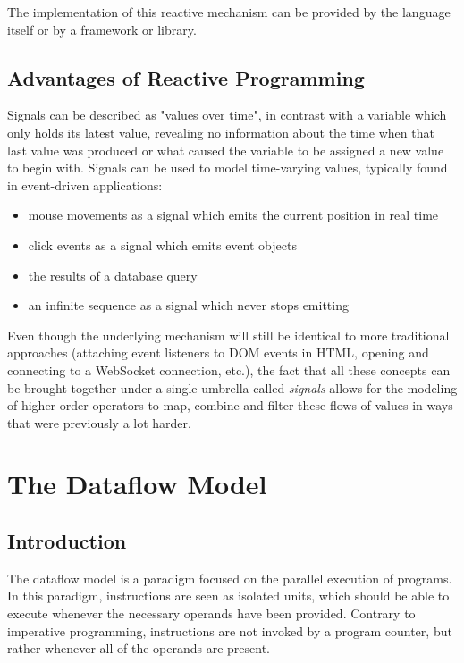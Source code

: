 The implementation of this reactive mechanism can be provided by the language itself or by a framework or library. 

\subsection{Advantages of Reactive Programming}

Signals can be described as "values over time", in contrast with a variable which only holds its latest value, revealing no information about the time when that last value was produced or what caused the variable to be assigned a new value to begin with. 
Signals can be used to model time-varying values, typically found in event-driven applications:
\begin{itemize}
	\item mouse movements as a signal which emits the current position in real time
	\item click events as a signal which emits event objects
	\item the results of a database query
    \item an infinite sequence as a signal which never stops emitting
\end{itemize}

Even though the underlying mechanism will still be identical to more traditional approaches (attaching event listeners to DOM events in HTML, opening and connecting to a WebSocket connection, etc.), the fact that all these concepts can be brought together under a single umbrella called \textit{signals} allows for the modeling of higher order operators to map, combine and filter these flows of values in ways that were previously a lot harder.

\section{The Dataflow Model}

\subsection{Introduction}

The dataflow model \cite{johnston_advances_2004} is a paradigm focused on the parallel execution of programs. In this paradigm, instructions are seen as isolated units, which should be able to execute whenever the necessary operands have been provided. Contrary to imperative programming, instructions are not invoked by a program counter, but rather whenever all of the operands are present. 


